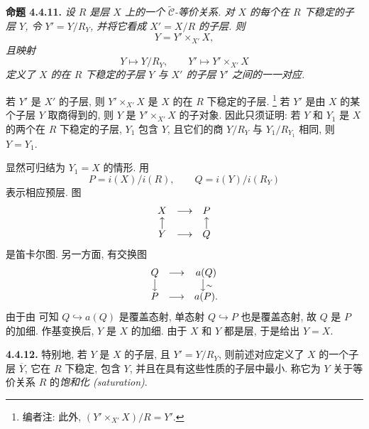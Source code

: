 
\setcounter{footnote}{38}

\medskip
\noindent{}\textbf{命题 4.4.11.}
\textit{设 \(R\) 是层 \(X\) 上的一个
\(\widetilde{\mathscr C}\)-等价关系.
对 \(X\) 的每个在 \(R\) 下稳定的子层 \(Y\),
令 \(Y'=Y/R_Y\), 并将它看成 \(X'=X/R\) 的子层. 则}
\[
  Y=Y'\times_{X'}X,
\]
\textit{且映射}
\[
  Y\longmapsto Y/R_Y,
  \qquad
  Y'\longmapsto Y'\times_{X'}X
\]
\textit{定义了 \(X\) 的在 \(R\) 下稳定的子层 \(Y\)
与 \(X'\) 的子层 \(Y'\) 之间的一一对应.}

若 \(Y'\) 是 \(X'\) 的子层,
则 \(Y'\times_{X'}X\) 是 \(X\) 的在 \(R\) 下稳定的子层.
\footnote{编者注: 此外, \((Y'\times_{X'}X)/R=Y'\).}
若 \(Y'\) 是由 \(X\) 的某个子层 \(Y\) 取商得到的,
则 \(Y\) 是 \(Y'\times_{X'}X\) 的子对象.
因此只须证明: 若 \(Y\) 和 \(Y_1\) 是 \(X\) 的两个在 \(R\) 下稳定的子层,
\(Y_1\) 包含 \(Y\), 且它们的商 \(Y/R_Y\) 与
\(Y_1/R_{Y_1}\) 相同, 则 \(Y=Y_1\).

显然可归结为 \(Y_1=X\) 的情形. 用
\[
  P=i(X)/i(R),\qquad Q=i(Y)/i(R_Y)
\]
表示相应预层. 图
\[
\begin{array}{ccc}
  X&\longrightarrow&P\\
  \big\uparrow&&\big\uparrow\\
  Y&\longrightarrow&Q
\end{array}
\]
是笛卡尔图. 另一方面, 有交换图
\[
\begin{array}{ccc}
  Q&\longrightarrow&a(Q)\\
  \big\downarrow&&\big\downarrow{\scriptstyle\sim}\\
  P&\longrightarrow&a(P).
\end{array}
\]
由于由  可知
\(Q\hookrightarrow a(Q)\) 是覆盖态射,
单态射 \(Q\hookrightarrow P\) 也是覆盖态射,
故 \(Q\) 是 \(P\) 的加细. 作基变换后, \(Y\) 是 \(X\) 的加细.
由于 \(X\) 和 \(Y\) 都是层, 
于是给出 \(Y=X\).

\medskip
\noindent{}\textbf{4.4.12.}
特别地, 若 \(Y\) 是 \(X\) 的子层, 且 \(Y'=Y/R_Y\),
则前述对应定义了 \(X\) 的一个子层 \(\overline Y\),
它在 \(R\) 下稳定, 包含 \(Y\), 并且在具有这些性质的子层中最小.
称它为 \(Y\) 关于等价关系 \(R\) 的\emph{饱和化 (saturation)}.

